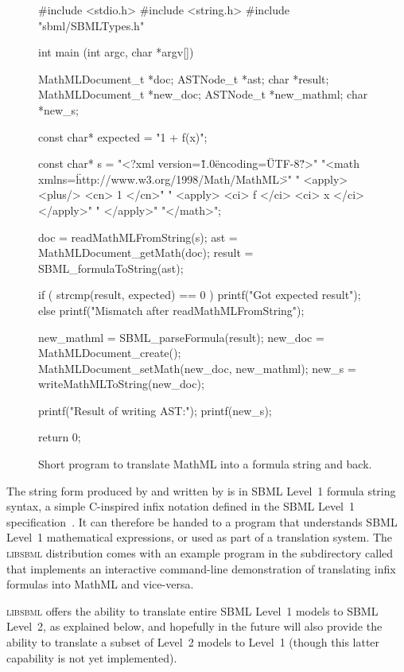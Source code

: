 \documentclass{sbmlmanual}
\newcommand{\libsbml}{\textsc{libsbml}}
\begin{document}
\begin{figure}[b]
  \begin{codeVerbatim}[C,flexiblecolumns=false]
#include <stdio.h>
#include <string.h>
#include "sbml/SBMLTypes.h"

int
main (int argc, char *argv[])
{
    MathMLDocument_t *doc;
    ASTNode_t        *ast;
    char             *result;
    MathMLDocument_t *new_doc;
    ASTNode_t        *new_mathml;
    char             *new_s;

    const char* expected = "1 + f(x)";

    const char* s = "<?xml version=\"1.0\" encoding=\"UTF-8\"?>"
        "<math xmlns=\"http://www.w3.org/1998/Math/MathML\">"
        "  <apply> <plus/> <cn> 1 </cn>"
        "                  <apply> <ci> f </ci> <ci> x </ci> </apply>"
        "  </apply>"
        "</math>";

    doc    = readMathMLFromString(s);
    ast    = MathMLDocument_getMath(doc);
    result = SBML_formulaToString(ast);

    if ( strcmp(result, expected) == 0 ) 
    {
        printf("Got expected result\n");
    }
    else
    {
        printf("Mismatch after readMathMLFromString\n");
    }

    new_mathml = SBML_parseFormula(result);
    new_doc    = MathMLDocument_create();
    MathMLDocument_setMath(new_doc, new_mathml);
    new_s      = writeMathMLToString(new_doc);

    printf("Result of writing AST:\n");
    printf(new_s);

    return 0;
}
  \end{codeVerbatim}
  \caption{Short program to translate MathML into a formula string and back.}
  \label{fig:eg-round-trip}
\end{figure}

The string form produced by  and written by
 is in SBML Level~1 formula string syntax, a
simple C-inspired infix notation defined in the SBML Level~1
specification~\cite{hucka_2001b}.  It can therefore be handed to a program
that understands SBML Level~1 mathematical expressions, or used as part of
a translation system.  The \libsbml{} distribution comes with an example
program in the  subdirectory called 
that implements an interactive command-line demonstration of translating
infix formulas into MathML and vice-versa.

\libsbml{} offers the ability to translate entire SBML Level~1 models to
SBML Level~2, as explained below, and hopefully in the future will also
provide the ability to translate a subset of Level~2 models to Level~1
(though this latter capability is not yet implemented).
\end{document}
